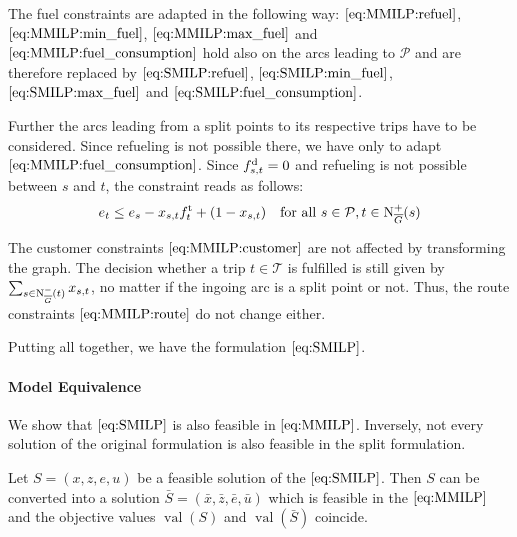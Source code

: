 The fuel constraints are adapted in the following way: $\eqref{eq:MMILP:refuel}$, $\eqref{eq:MMILP:min_fuel}$, $\eqref{eq:MMILP:max_fuel}$ and $\eqref{eq:MMILP:fuel_consumption}$ hold also on the arcs leading to $\mathcal{P}$ and are therefore replaced by $\eqref{eq:SMILP:refuel}$, $\eqref{eq:SMILP:min_fuel}$, $\eqref{eq:SMILP:max_fuel}$ and $\eqref{eq:SMILP:fuel_consumption}$.

Further the arcs leading from a split points to its respective trips have to be considered. Since refueling is not possible there, we have only to adapt $\eqref{eq:MMILP:fuel_consumption}$. Since $f^{\operatorname{d}}_{s,t} = 0$ and refueling is not possible between $s$ and $t$, the constraint reads as follows:
\begin{align}
	e_t \leq e_s - x_{s,t}f^{\operatorname{t}}_t + \left(1-x_{s,t}\right) && \text{for all } s\in \mathcal{P},t\in\operatorname{N}_{\overline{G}}^+(s) \label{eq:SMILP:fuel_splitpoint}
\end{align}

The customer constraints $\eqref{eq:MMILP:customer}$ are not affected by transforming the graph. The decision whether a trip $t\in\mathcal{T}$ is fulfilled is still given by $\sum_{s\in\operatorname{N}_{\overline{G}}^-(t)} x_{s,t}$, no matter if the ingoing arc is a split point or not. Thus, the route constraints $\eqref{eq:MMILP:route}$ do not change either.

Putting all together, we have the formulation $\eqref{eq:SMILP}$.

\paragraph{Model Equivalence} \parfill

We show that $\eqref{eq:SMILP}$ is also feasible in $\eqref{eq:MMILP}$. Inversely, not every solution of the original formulation is also feasible in the split formulation.

\begin{theorem}
\label{thm:equivalence_SMILP_MMILP}

Let ${S=(x,z,e,u)}$ be a feasible solution of the $\eqref{eq:SMILP}$. Then $S$ can be converted into a solution ${\bar{S}=\left(\bar{x},\bar{z},\bar{e},\bar{u}\right)}$ which is feasible in the $\eqref{eq:MMILP}$ and the objective values $\operatorname{val}(S)$ and $\operatorname{val}(\bar{S})$ coincide.

\end{theorem}

